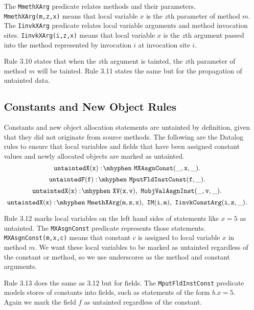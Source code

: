 The \texttt{MmethXArg} predicate relates methods and their
parameters. \\ \texttt{MmethXArg(m,z,x)} means that local variable $x$
is the $z$th parameter of method $m$. The \texttt{IinvkXArg} predicate
relates local variable arguments and method invocation
sites. \texttt{IinvkXArg(i,z,x)} means that local variable $x$ is the
$z$th argument passed into the method represented by invocation $i$ at
invocation site $i$.

Rule 3.10 states that when the $z$th argument is tainted, the $z$th
parameter of method $m$ will be tainted. Rule 3.11 states the same but
for the propagation of untainted data.
\subsection{Constants and New Object Rules}
Constants and new object allocation statements are untainted by
definition, given that they did not originate from source methods. The
following are the Datalog rules to ensure that local variables and
fields that have been assigned constant values and newly allocated
objects are marked as untainted.
\begin{equation}
  \mathtt{untaintedX(x) \is MXAsgnConst(\_,x,\_).}
\end{equation}
\begin{equation}
  \mathtt{untaintedF(f) \is MputFldInstConst(f,\_).}
\end{equation}
\begin{equation}
  \mathtt{untaintedX(x) \is XV(x,v) \also MobjValAsgnInst(\_,v,\_).}
\end{equation}
\begin{equation}
  \mathtt{untaintedX(x) \is MmethXArg(m,z,x) \also IM(i,m) \also
    IinvkConstArg(i,z,\_).}
\end{equation}

Rule 3.12 marks local variables on the left hand sides of statements
like $x = 5$ as untainted. The \texttt{MXAsgnConst} predicate
represents those statements. \texttt{MXAsgnConst(m,x,c)} means that
constant $c$ is assigned to local variable $x$ in method $m$. We want
these local variables to be marked as untainted regardless of the
constant or method, so we use underscores as the method and constant
arguments.

Rule 3.13 does the same as 3.12 but for fields. The
\texttt{MputFldInstConst} predicate models stores of constants into
fields, such as statements of the form $b.x = 5$. Again we mark the
field $f$ as untainted regardless of the constant.

